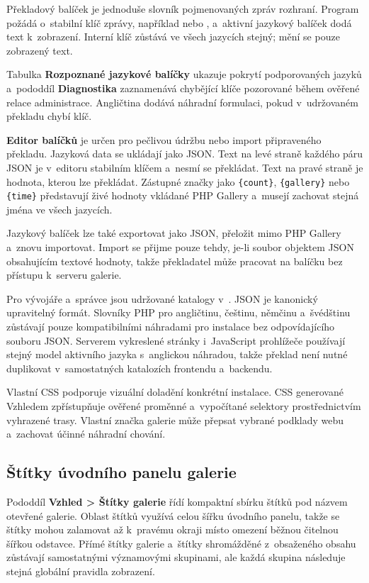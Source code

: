 \documentclass[11pt,a4paper]{article}
\newcommand{\filepath}[1]{\path{#1}}
\newcommand{\ui}[1]{\textbf{#1}}
\newcommand{\codeword}[1]{\nolinkurl{#1}}
\begin{document}
Překladový balíček je jednoduše slovník pojmenovaných zpráv rozhraní. Program
požádá o~stabilní klíč zprávy, například  nebo , a~aktivní jazykový balíček dodá text k~zobrazení. Interní
klíč zůstává ve všech jazycích stejný; mění se pouze zobrazený text.

Tabulka \ui{Rozpoznané jazykové balíčky} ukazuje pokrytí podporovaných jazyků
a~pododdíl \ui{Diagnostika} zaznamenává chybějící klíče pozorované během ověřené
relace administrace. Angličtina dodává náhradní formulaci, pokud v~udržovaném
překladu chybí klíč.

\ui{Editor balíčků} je určen pro pečlivou údržbu nebo import připraveného
překladu. Jazyková data se ukládají jako JSON. Text na levé straně každého páru
JSON je v~editoru stabilním klíčem a~nesmí se překládat. Text na pravé straně je
hodnota, kterou lze překládat. Zástupné značky jako \codeword{\{count\}},
\codeword{\{gallery\}} nebo \codeword{\{time\}} představují živé hodnoty
vkládané PHP Gallery a~musejí zachovat stejná jména ve všech jazycích.

Jazykový balíček lze také exportovat jako JSON, přeložit mimo PHP Gallery
a~znovu importovat. Import se přijme pouze tehdy, je-li soubor objektem JSON
obsahujícím textové hodnoty, takže překladatel může pracovat na balíčku bez
přístupu k~serveru galerie.

Pro vývojáře a~správce jsou udržované katalogy v~\filepath{app/lang/}. JSON je
kanonický upravitelný formát. Slovníky PHP pro angličtinu, češtinu, němčinu
a~švédštinu zůstávají pouze kompatibilními náhradami pro instalace bez
odpovídajícího souboru JSON. Serverem vykreslené stránky i~JavaScript prohlížeče
používají stejný model aktivního jazyka s~anglickou náhradou, takže překlad není
nutné duplikovat v~samostatných katalozích frontendu a~backendu.

Vlastní CSS podporuje vizuální doladění konkrétní instalace. CSS generované
Vzhledem zpřístupňuje ověřené proměnné a~vypočítané selektory prostřednictvím
vyhrazené trasy. Vlastní značka galerie může přepsat vybrané podklady webu
a~zachovat účinné náhradní chování.

\subsection{Štítky úvodního panelu galerie}

Pododdíl \ui{Vzhled > Štítky galerie} řídí kompaktní sbírku štítků pod názvem
otevřené galerie. Oblast štítků využívá celou šířku úvodního panelu, takže se
štítky mohou zalamovat až k~pravému okraji místo omezení běžnou čitelnou šířkou
odstavce. Přímé štítky galerie a~štítky shromážděné z~obsaženého obsahu
zůstávají samostatnými významovými skupinami, ale každá skupina následuje stejná
globální pravidla zobrazení.
\end{document}
